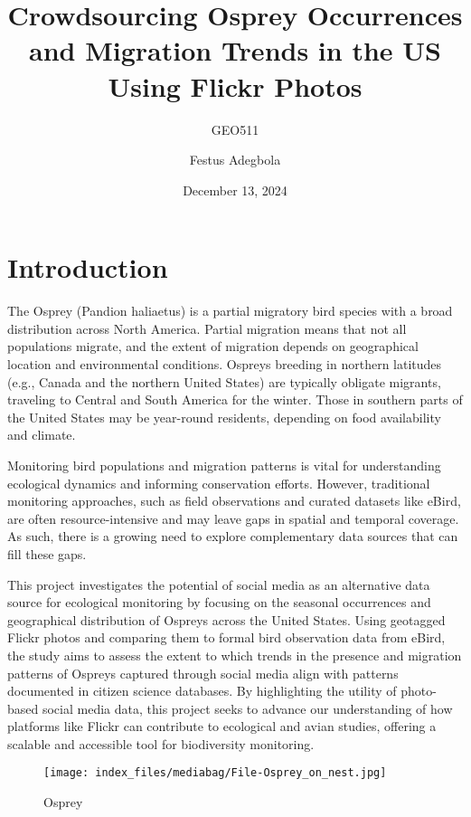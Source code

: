 \documentclass[
  letterpaper,
  DIV=11,
  numbers=noendperiod]{scrartcl}
\title{Crowdsourcing Osprey Occurrences and Migration Trends in the US
Using Flickr Photos}
\subtitle{GEO511}
\author{Festus Adegbola}
\date{December 13, 2024}
\begin{document}
\maketitle

\section{Introduction}\label{introduction}

The Osprey (Pandion haliaetus) is a partial migratory bird species with
a broad distribution across North America. Partial migration means that
not all populations migrate, and the extent of migration depends on
geographical location and environmental conditions. Ospreys breeding in
northern latitudes (e.g., Canada and the northern United States) are
typically obligate migrants, traveling to Central and South America for
the winter. Those in southern parts of the United States may be
year-round residents, depending on food availability and climate.

Monitoring bird populations and migration patterns is vital for
understanding ecological dynamics and informing conservation efforts.
However, traditional monitoring approaches, such as field observations
and curated datasets like eBird, are often resource-intensive and may
leave gaps in spatial and temporal coverage. As such, there is a growing
need to explore complementary data sources that can fill these gaps.

This project investigates the potential of social media as an
alternative data source for ecological monitoring by focusing on the
seasonal occurrences and geographical distribution of Ospreys across the
United States. Using geotagged Flickr photos and comparing them to
formal bird observation data from eBird, the study aims to assess the
extent to which trends in the presence and migration patterns of Ospreys
captured through social media align with patterns documented in citizen
science databases. By highlighting the utility of photo-based social
media data, this project seeks to advance our understanding of how
platforms like Flickr can contribute to ecological and avian studies,
offering a scalable and accessible tool for biodiversity monitoring.

\begin{figure}[H]

{\centering \texttt{[image: index\_files/mediabag/File-Osprey\_on\_nest.jpg]}

}

\caption{Osprey}

\end{figure}%
\end{document}
